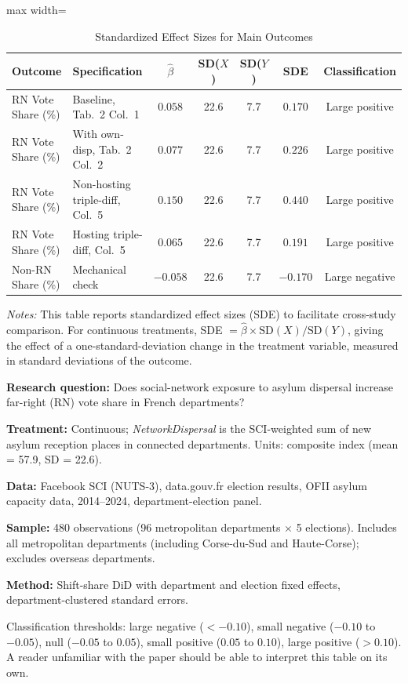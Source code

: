 \documentclass[12pt]{article}
\begin{document}
\begin{table}[H]
\centering
\caption{Standardized Effect Sizes for Main Outcomes}
\label{tab:sde}
\begin{adjustbox}{max width=\textwidth}
\begin{tabular}{llccccc}
\toprule
Outcome & Specification & $\hat{\beta}$ & SD($X$) & SD($Y$) & SDE & Classification \\
\midrule
RN Vote Share (\%) & Baseline, Tab.\ 2 Col.\ 1 & $0.058$ & 22.6 & 7.7 & $0.170$ & Large positive \\
RN Vote Share (\%) & With own-disp, Tab.\ 2 Col.\ 2 & $0.077$ & 22.6 & 7.7 & $0.226$ & Large positive \\
RN Vote Share (\%) & Non-hosting triple-diff, Col.\ 5 & $0.150$ & 22.6 & 7.7 & $0.440$ & Large positive \\
RN Vote Share (\%) & Hosting triple-diff, Col.\ 5 & $0.065$ & 22.6 & 7.7 & $0.191$ & Large positive \\
Non-RN Share (\%) & Mechanical check & $-0.058$ & 22.6 & 7.7 & $-0.170$ & Large negative \\
\bottomrule
\end{tabular}
\end{adjustbox}
\par\vspace{0.3em}
{\footnotesize \emph{Notes:} This table reports standardized effect sizes (SDE) to facilitate cross-study comparison. For continuous treatments, SDE $= \hat{\beta} \times \text{SD}(X) / \text{SD}(Y)$, giving the effect of a one-standard-deviation change in the treatment variable, measured in standard deviations of the outcome.

\textbf{Research question:} Does social-network exposure to asylum dispersal increase far-right (RN) vote share in French departments?

\textbf{Treatment:} Continuous; \textit{NetworkDispersal} is the SCI-weighted sum of new asylum reception places in connected departments. Units: composite index (mean = 57.9, SD = 22.6).

\textbf{Data:} Facebook SCI (NUTS-3), data.gouv.fr election results, OFII asylum capacity data, 2014--2024, department-election panel.

\textbf{Sample:} 480 observations (96 metropolitan departments $\times$ 5 elections). Includes all metropolitan departments (including Corse-du-Sud and Haute-Corse); excludes overseas departments.

\textbf{Method:} Shift-share DiD with department and election fixed effects, department-clustered standard errors.

Classification thresholds: large negative ($< -0.10$), small negative ($-0.10$ to $-0.05$), null ($-0.05$ to $0.05$), small positive ($0.05$ to $0.10$), large positive ($> 0.10$). A reader unfamiliar with the paper should be able to interpret this table on its own.}
\end{table}
\end{document}
